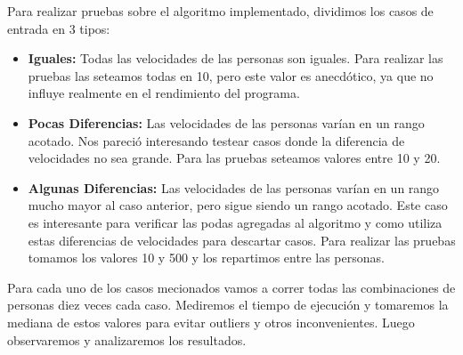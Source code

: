 \par Para realizar pruebas sobre el algoritmo implementado, dividimos los casos de entrada en 3 tipos:
\begin{itemize}
	\item \textbf{Iguales:} Todas las velocidades de las personas son iguales. Para realizar las pruebas las seteamos todas en 10, pero este valor es anecdótico, ya que no influye realmente en el rendimiento del programa.
	\item \textbf{Pocas Diferencias:} Las velocidades de las personas varían en un rango acotado. Nos pareció interesando testear casos donde la diferencia de velocidades no sea grande. Para las pruebas seteamos valores entre 10 y 20.
	\item \textbf{Algunas Diferencias:} Las velocidades de las personas varían en un rango mucho mayor al caso anterior, pero sigue siendo un rango acotado. Este caso es interesante para verificar las podas agregadas al algoritmo y como utiliza estas diferencias de velocidades para descartar casos. Para realizar las pruebas tomamos los valores 10 y 500 y los repartimos entre las personas.
\end{itemize}

\par Para cada uno de los casos mecionados vamos a correr todas las combinaciones de personas diez veces cada caso. Mediremos el tiempo de ejecución y tomaremos la mediana de estos valores para evitar outliers y otros inconvenientes. Luego observaremos y analizaremos los resultados.

